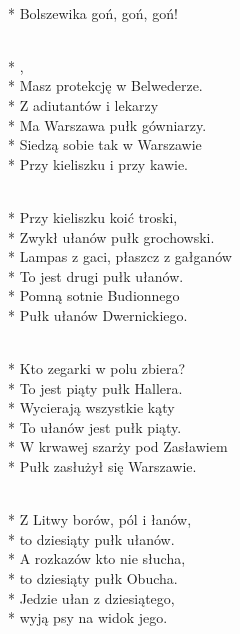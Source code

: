 \begin{lyrics}[longestline={\intertitle{1. Pułk Szwoleżerów J. Piłsudskiego}}]

\begin{chorus}
\\*
Bolszewika goń, goń, goń!
\end{chorus}

\\*
\smallskip
{},\\*
Masz protekcję w Belwederze.\\*
\medskip
Z adiutantów i lekarzy\\*
Ma Warszawa pułk gówniarzy.\\*
\medskip
Siedzą sobie tak w Warszawie\\*
Przy kieliszku i przy kawie.

\\*
\smallskip
Przy kieliszku koić troski,\\*
Zwykł ułanów pułk grochowski.\\*
\medskip
Lampas z gaci, płaszcz z gałganów\\*
To jest drugi pułk ułanów.\\*
\medskip
Pomną sotnie Budionnego\\*
Pułk ułanów Dwernickiego.

\\*
\smallskip
Kto zegarki w polu zbiera?\\*
To jest piąty pułk Hallera.\\*
\medskip
Wycierają wszystkie kąty\\*
To ułanów jest pułk piąty.\\*
\medskip
W krwawej szarży pod Zasławiem\\*
Pułk zasłużył się Warszawie.

\\*
\smallskip
Z Litwy borów, pól i łanów,\\*
to dziesiąty pułk ułanów.\\*
\medskip
A rozkazów kto nie słucha,\\*
to dziesiąty pułk Obucha.\\*
\medskip
Jedzie ułan z dziesiątego,\\*
wyją psy na widok jego.

\breaklyrics


\end{lyrics}
